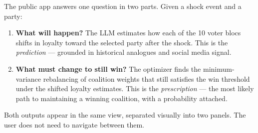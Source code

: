 \documentclass[11pt]{article}
\begin{document}
The public app answers one question in two parts. Given a shock event and a party:

\begin{enumerate}[leftmargin=2em, itemsep=4pt]
  \item \textbf{What will happen?} The LLM estimates how each of the 10 voter blocs
        shifts in loyalty toward the selected party after the shock. This is the
        \emph{prediction} --- grounded in historical analogues and social media signal.

  \item \textbf{What must change to still win?} The optimizer finds the minimum-variance
        rebalancing of coalition weights that still satisfies the win threshold under the
        shifted loyalty estimates. This is the \emph{prescription} --- the most likely
        path to maintaining a winning coalition, with a probability attached.
\end{enumerate}

Both outputs appear in the same view, separated visually into two panels. The user
does not need to navigate between them.
\end{document}

